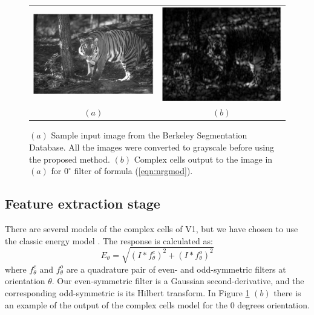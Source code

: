 \documentclass{llncs}
\begin{document}
\begin{figure}[]
	\begin{center}
		\begin{tabular}{cc}
			\includegraphics[width=0.45\linewidth]{./figs/af/esempio} &
			\includegraphics[width=0.45\linewidth]{./figs/af/esempio_fil} \\
			$(a)$ & $(b)$
		\end{tabular}
    \caption{$(a)$ Sample input image from the Berkeley Segmentation Database.
     All the images were converted to grayscale before using the proposed method.
     $(b)$ Complex cells output to the image in $(a)$ for $0^\circ$ filter of formula (\ref{eqn:nrgmod}).}
    \label{fig:exampleimg}
	\end{center}
\end{figure}


\subsection{Feature extraction stage}
\label{sec:ass_feature}
There are several models of the complex cells of V1, but we have chosen to
use the classic energy model \cite{Morrone88}.
The response is calculated as:
\begin{equation} \label{eqn:nrgmod}
E_\theta=\sqrt{\left(I*f^{e}_\theta \right)^2+\left(I*f^{o}_\theta \right)^2}
\end{equation}
where $f^{e}_\theta$ and $f^{o}_\theta$ are a quadrature pair of even- and
odd-symmetric filters at orientation $\theta$. Our even-symmetric filter is
a Gaussian second-derivative, and the corresponding odd-symmetric is its
Hilbert transform.
In Figure \ref{fig:exampleimg} $(b)$ there is an example of the output of the
complex cells model for the $0$ degrees orientation.
\end{document}
